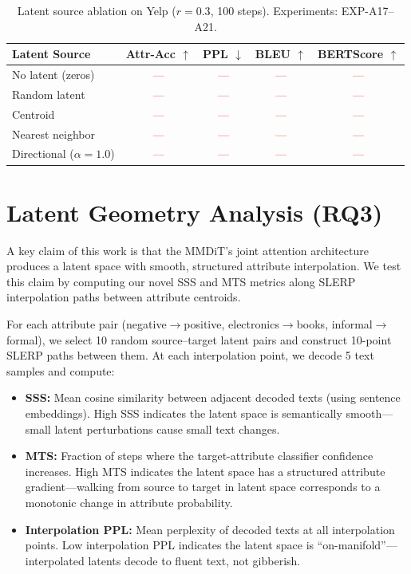 \documentclass{article}
\newcommand{\tbd}[1]{\textcolor{red}{#1}}  %
\begin{document}
\begin{table}[h]
\centering
\caption{Latent source ablation on Yelp ($r=0.3$, 100 steps). Experiments: EXP-A17--A21.}
\label{tab:ablation_latent_source}
\begin{tabular}{lcccc}
\toprule
\textbf{Latent Source} & \textbf{Attr-Acc $\uparrow$} & \textbf{PPL $\downarrow$} & \textbf{BLEU $\uparrow$} & \textbf{BERTScore $\uparrow$} \\
\midrule
No latent (zeros) & \tbd{---} & \tbd{---} & \tbd{---} & \tbd{---} \\
Random latent & \tbd{---} & \tbd{---} & \tbd{---} & \tbd{---} \\
Centroid & \tbd{---} & \tbd{---} & \tbd{---} & \tbd{---} \\
Nearest neighbor & \tbd{---} & \tbd{---} & \tbd{---} & \tbd{---} \\
Directional ($\alpha=1.0$) & \tbd{---} & \tbd{---} & \tbd{---} & \tbd{---} \\
\bottomrule
\end{tabular}
\end{table}

\section{Latent Geometry Analysis (RQ3)}
\label{sec:geometry}

A key claim of this work is that the MMDiT's joint attention architecture produces a latent space with smooth, structured attribute interpolation. We test this claim by computing our novel SSS and MTS metrics along SLERP interpolation paths between attribute centroids.

For each attribute pair (negative$\to$positive, electronics$\to$books, informal$\to$formal), we select 10 random source--target latent pairs and construct 10-point SLERP paths between them. At each interpolation point, we decode 5 text samples and compute:
\begin{itemize}
  \item \textbf{SSS:} Mean cosine similarity between adjacent decoded texts (using sentence embeddings). High SSS indicates the latent space is semantically smooth---small latent perturbations cause small text changes.
  \item \textbf{MTS:} Fraction of steps where the target-attribute classifier confidence increases. High MTS indicates the latent space has a structured attribute gradient---walking from source to target in latent space corresponds to a monotonic change in attribute probability.
  \item \textbf{Interpolation PPL:} Mean perplexity of decoded texts at all interpolation points. Low interpolation PPL indicates the latent space is ``on-manifold''---interpolated latents decode to fluent text, not gibberish.
\end{itemize}
\end{document}
